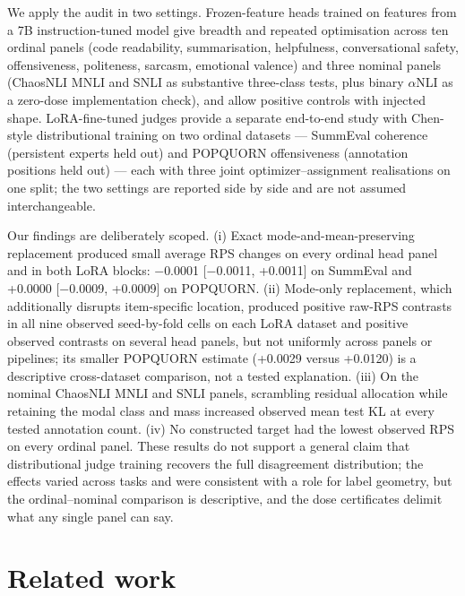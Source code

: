 \documentclass[10pt]{article}
\begin{document}
We apply the audit in two settings. Frozen-feature heads trained on features from a 7B instruction-tuned model give breadth and repeated optimisation across ten ordinal panels (code readability, summarisation, helpfulness, conversational safety, offensiveness, politeness, sarcasm, emotional valence) and three nominal panels (ChaosNLI MNLI and SNLI as substantive three-class tests, plus binary $\alpha$NLI as a zero-dose implementation check), and allow positive controls with injected shape. LoRA-fine-tuned judges provide a separate end-to-end study with Chen-style distributional training on two ordinal datasets --- SummEval coherence (persistent experts held out) and POPQUORN offensiveness (annotation positions held out) --- each with three joint optimizer--assignment realisations on one split; the two settings are reported side by side and are not assumed interchangeable.

Our findings are deliberately scoped. (i) Exact mode-and-mean-preserving replacement produced small average RPS changes on every ordinal head panel and in both LoRA blocks: $-$0.0001 {[}$-$0.0011, +0.0011{]} on SummEval and +0.0000 {[}$-$0.0009, +0.0009{]} on POPQUORN. (ii) Mode-only replacement, which additionally disrupts item-specific location, produced positive raw-RPS contrasts in all nine observed seed-by-fold cells on each LoRA dataset and positive observed contrasts on several head panels, but not uniformly across panels or pipelines; its smaller POPQUORN estimate (+0.0029 versus +0.0120) is a descriptive cross-dataset comparison, not a tested explanation. (iii) On the nominal ChaosNLI MNLI and SNLI panels, scrambling residual allocation while retaining the modal class and mass increased observed mean test KL at every tested annotation count. (iv) No constructed target had the lowest observed RPS on every ordinal panel. These results do not support a general claim that distributional judge training recovers the full disagreement distribution; the effects varied across tasks and were consistent with a role for label geometry, but the ordinal--nominal comparison is descriptive, and the dose certificates delimit what any single panel can say.

\section{Related work}
\end{document}
